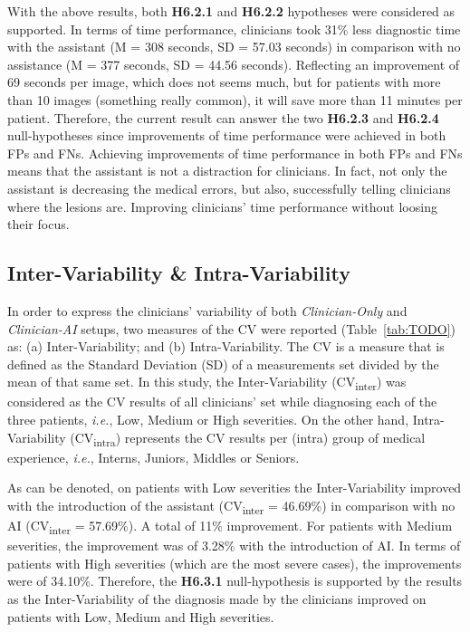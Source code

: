 With the above results, both {\bf H6.2.1} and {\bf H6.2.2} hypotheses were considered as supported.
In terms of time performance, clinicians took 31\% less diagnostic time with the assistant (M = 308 seconds, SD = 57.03 seconds) in comparison with no assistance (M = 377 seconds, SD = 44.56 seconds).
Reflecting an improvement of 69 seconds per image, which does not seems much, but for patients with more than 10 images (something really common), it will save more than 11 minutes per patient.
Therefore, the current result can answer the two {\bf H6.2.3} and {\bf H6.2.4} null-hypotheses since improvements of time performance were achieved in both \acp{FP} and \acp{FN}.
Achieving improvements of time performance in both \acp{FP} and \acp{FN} means that the assistant is not a distraction for clinicians.
In fact, not only the assistant is decreasing the medical errors, but also, successfully telling clinicians where the lesions are.
Improving clinicians' time performance without loosing their focus.

\subsection{Inter-Variability \& Intra-Variability}
\label{sec:app002004003}

In order to express the clinicians' variability of both {\it Clinician-Only} and {\it Clinician-AI} setups, two measures of the \acf{CV} were reported (Table~\ref{tab:TODO}) as:
(a) Inter-Variability; and
(b) Intra-Variability.
The \ac{CV} is a measure that is defined as the Standard Deviation (SD) of a measurements set divided by the mean of that same set.
In this study, the Inter-Variability (CV\textsubscript{inter}) was considered as the \ac{CV} results of all clinicians' set while diagnosing each of the three patients, {\it i.e.}, Low, Medium or High severities.
On the other hand, Intra-Variability (CV\textsubscript{intra}) represents the \ac{CV} results per (intra) group of medical experience, {\it i.e.}, Interns, Juniors, Middles or Seniors.



As can be denoted, on patients with Low severities the Inter-Variability improved with the introduction of the assistant (CV\textsubscript{inter} = 46.69\%) in comparison with no \ac{AI} (CV\textsubscript{inter} = 57.69\%).
A total of 11\% improvement.
For patients with Medium severities, the improvement was of 3.28\% with the introduction of \ac{AI}.
In terms of patients with High severities (which are the most severe cases), the improvements were of 34.10\%.
Therefore, the {\bf H6.3.1} null-hypothesis is supported by the results as the Inter-Variability of the diagnosis made by the clinicians improved on patients with Low, Medium and High severities.

